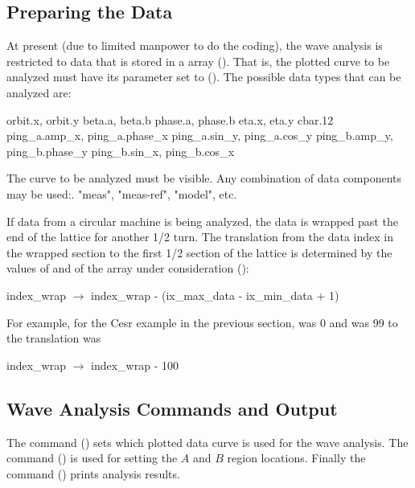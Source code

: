 \subsection{Preparing the Data} 
\label{ss:wave.data}

At present (due to limited manpower to do the
coding), the wave analysis is restricted to data that is stored in a
 array (). That is, the plotted curve to be
analyzed must have its  parameter set to
 (). The possible data types that
can be analyzed are:
\begin{example}
  orbit.x, orbit.y
  beta.a,  beta.b
  phase.a, phase.b
  eta.x, eta.y
  cbar.12
  ping_a.amp_x, ping_a.phase_x
  ping_a.sin_y, ping_a.cos_y
  ping_b.amp_y, ping_b.phase_y
  ping_b.sin_x, ping_b.cos_x
\end{example}
The curve to be analyzed must be visible. Any combination of data
components may be used:. "meas", "meas-ref", "model", etc.

If data from a circular machine is being analyzed, the data is wrapped
past the end of the lattice for another 1/2 turn. The translation from
the data index in the wrapped section to the first 1/2 section of the
lattice is determined by the values of  and
 of the  array under consideration
():
\begin{example}
  index_wrap \(\longrightarrow\) index_wrap - (ix_max_data - ix_min_data + 1)
\end{example}
For example, for the Cesr example in the previous section,
 was 0 and  was 99 to the translation
was
\begin{example}
  index_wrap \(\longrightarrow\) index_wrap - 100
\end{example}

\subsection{Wave Analysis Commands and Output}
\label{ss:wave.cmd.out}

The  command () sets which plotted data curve
is used for the wave analysis. The  command () 
is used for setting the $A$ and $B$ region locations. Finally the 
 command () prints analysis results. 

